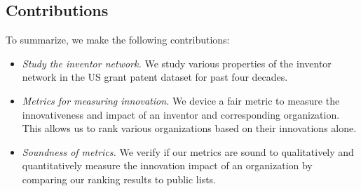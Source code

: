 \subsection{Contributions}

To summarize, we make the following contributions:

\begin{itemize} 
\squish
\item {\em Study the inventor network.} We study various properties of the inventor network in the US grant patent dataset for past four decades.  
\item {\em Metrics for measuring innovation.} We device a fair metric to measure the innovativeness and impact of an inventor and corresponding organization. This allows us to rank various organizations based on their innovations alone. 
\item {\em Soundness of metrics.} We verify if our metrics are sound to qualitatively and quantitatively measure the innovation impact of an organization by comparing our ranking results to public lists.
\end{itemize}


